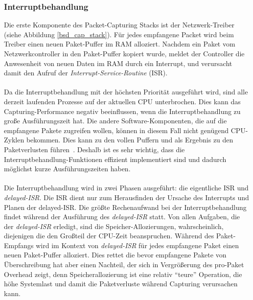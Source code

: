\subsubsection{Interruptbehandlung}\label{sec:intr_behandlung}
Die erste Komponente des Packet-Capturing Stacks ist der Netzwerk-Treiber
(siehe Abbildung \ref{bsd_cap_stack}). Für jedes empfangene Packet wird beim
Treiber einen neuen Paket-Puffer im RAM alloziert. Nachdem ein Paket vom
Netzwerkcontroller in den Paket-Puffer kopiert wurde, meldet der Controller
die Anwesenheit von neuen Daten im RAM durch ein Interrupt, und verursacht
damit den Aufruf der \emph{Interrupt-Service-Routine} (ISR).\\\\ 
%
Da die Interruptbehandlung mit der höchsten Priorität ausgeführt wird, sind
alle derzeit laufenden Prozesse auf der aktuellen CPU unterbrochen. Dies kann
das Capturing-Performance negativ beeinflussen, wenn die Interruptbehandlung zu
große  Ausführungszeit hat. Die andere Software-Komponenten, die auf die
empfangene Pakete zugreifen wollen, können in diesem Fall nicht genügend
CPU-Zyklen bekommen.  Dies kann zu den vollen Puffern und als Ergebnis zu
den Paketverlusten führen~\cite{elim_recv_lock}. Deshalb ist es sehr wichtig,
dass die Interruptbehandlung-Funktionen effizient implementiert sind und
dadurch möglichst kurze Ausführungszeiten haben.\\\\
%
Die Interruptbehandlung wird in zwei Phasen ausgeführt: die eigentliche ISR und
\emph{delayed-ISR}. Die ISR dient nur zum Herausfinden der Ursache des
Interrupts und Planen der delayed-ISR. Die größte Rechenaufwand bei der
Interruptbehandlung findet während der Ausführung des \emph{delayed-ISR} statt.
Von allen Aufgaben, die der \emph{delayed-ISR} erledigt, sind die
Speicher-Allozierungen, wahrscheinlich, diejenigen die den Großteil der
CPU-Zeit beanspruchen. Während des Paket-Empfangs wird im Kontext von
\emph{delayed-ISR} für jedes empfangene Paket einen neuen Paket-Puffer
alloziert. Dies rettet die bevor empfangene Pakete von Überschreibung hat aber
einen Nachteil, der sich in Vergrößerung des pro-Paket Overhead zeigt, denn
Speicherallozierung ist eine relativ ``teure'' Operation, die höhe Systemlast
und damit die Paketverluste während Capturing verursachen kann.
%
